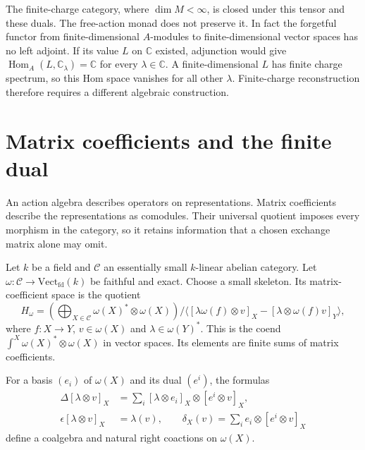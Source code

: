 The finite-charge category, where $\dim M<\infty$, is closed under
this tensor and these duals. The free-action monad does not preserve
it. In fact the forgetful functor from finite-dimensional
$A$-modules to finite-dimensional vector spaces has no left adjoint.
If its value $L$ on $\mathbb C$ existed, adjunction would give
$\operatorname{Hom}_A(L,\mathbb C_\lambda)=\mathbb C$ for every
$\lambda\in\mathbb C$. A finite-dimensional $L$ has finite charge
spectrum, so this Hom space vanishes for all other $\lambda$.
Finite-charge reconstruction therefore requires a different
algebraic construction.

\section{Matrix coefficients and the finite dual}

An action algebra describes operators on representations. Matrix
coefficients describe the representations as comodules. Their
universal quotient imposes every morphism in the category, so it
retains information that a chosen exchange matrix alone may omit.

Let $k$ be a field and $\mathcal C$ an essentially small
$k$-linear abelian category. Let
$\omega:\mathcal C\to\mathrm{Vect}_{\mathrm{fd}}(k)$ be faithful
and exact. Choose a small skeleton. Its matrix-coefficient space is
the quotient
\begin{equation}\label{cyrec:eq:coend}
 H_\omega=
 \left(\bigoplus_{X\in\mathcal C}\omega(X)^*\otimes\omega(X)\right)
 \big/\bigl\langle
 [\lambda\omega(f)\otimes v]_X-
 [\lambda\otimes\omega(f)v]_Y
 \bigr\rangle,
\end{equation}
where $f:X\to Y$, $v\in\omega(X)$ and
$\lambda\in\omega(Y)^*$. This is the coend
$\int^X\omega(X)^*\otimes\omega(X)$ in vector spaces.
Its elements are finite sums of matrix coefficients.

\begin{proposition}\label{cyrec:prop:coefficients}
For a basis $(e_i)$ of $\omega(X)$ and its dual $(e^i)$, the
formulas
\begin{align}
 \Delta[\lambda\otimes v]_X
 &=\sum_i[\lambda\otimes e_i]_X
                \otimes[e^i\otimes v]_X,\label{cyrec:eq:coend-delta}\\
 \epsilon[\lambda\otimes v]_X&=\lambda(v),
 \qquad
 \delta_X(v)=\sum_i e_i\otimes[e^i\otimes v]_X
 \label{cyrec:eq:coaction}
\end{align}
define a coalgebra and natural right coactions on $\omega(X)$.
\end{proposition}

